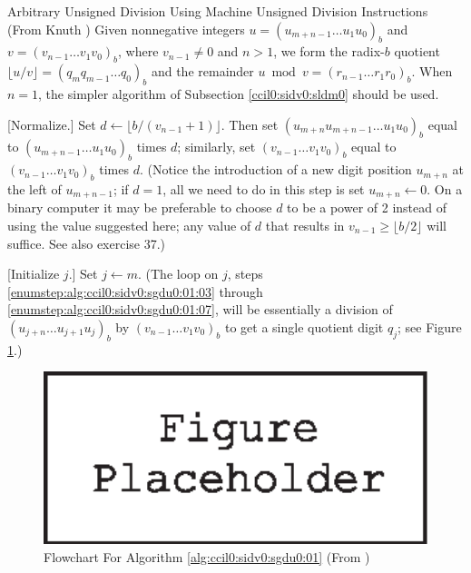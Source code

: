 \begin{vworkalgorithmstatementpar}{Arbitrary Unsigned Division Using 
Machine Unsigned Division Instructions}
\label{alg:ccil0:sidv0:sgdu0:01}
(From Knuth \cite[pp. 272-273]{bibref:b:knuthclassic2ndedvol2})
Given nonnegative integers $u=(u_{m+n-1} \ldots{} u_1 u_0)_b$
and $v=(v_{n-1} \ldots{} v_1 v_0)_b$, where
$v_{n-1} \neq 0$ and $n > 1$, we form the radix-$b$ quotient
$\lfloor{}u/v\rfloor{} = (q_m q_{m-1} \ldots{} q_0)_b$ and
the remainder $u \bmod v = (r_{n-1} \ldots{} r_1 r_0)_b$.  When
$n=1$, the simpler algorithm of 
Subsection \ref{ccil0:sidv0:sldm0}
should be used. 

\begin{algblvl0}
\item \label{enumstep:alg:ccil0:sidv0:sgdu0:01:01}
      [Normalize.] Set $d \gets \lfloor{}b/(v_{n-1} + 1)\rfloor$.
      Then set $(u_{m+n} u_{m+n-1} \ldots{} u_1 u_0)_b$ equal to 
      $(u_{m+n-1} \ldots{} u_1 u_0)_b$ times $d$; similarly,
      set $(v_{n-1} \ldots{} v_1 v_0)_b$ equal to 
      $(v_{n-1} \ldots{} v_1 v_0)_b$ times $d$.  (Notice the introduction
      of a new digit position $u_{m+n}$ at the left of
      $u_{m+n-1}$; if $d=1$, all we need to do in this step is set
      $u_{m+n} \gets 0$.  On a binary computer it may be preferable
      to choose $d$ to be a power of 2 instead of using the value
      suggested here; any value of $d$ that results in
      $v_{n-1} \geq \lfloor{}b/2\rfloor$ will suffice.  See also
      exercise 37.)
\item \label{enumstep:alg:ccil0:sidv0:sgdu0:01:02}
      [Initialize $j$.]  Set $j \gets m$.  (The loop on $j$,
      steps 
      \ref{enumstep:alg:ccil0:sidv0:sgdu0:01:03} 
      through 
      \ref{enumstep:alg:ccil0:sidv0:sgdu0:01:07}, 
      will be essentially a division of 
      $(u_{j+n} \ldots{} u_{j+1} u_j)_b$ by $(v_{n-1} \ldots{} v_1 v_0)_b$ to
      get a single quotient digit $q_j$; see Figure \ref{fig:alg:ccil0:sidv0:sgdu0:01:01}.)

\begin{figure}
\centering
\includegraphics[width=4.6in]{c_cil0/kdfc01.eps}
\caption{Flowchart For Algorithm \ref{alg:ccil0:sidv0:sgdu0:01} (From \cite[p. 273]{bibref:b:knuthclassic2ndedvol2})}
\label{fig:alg:ccil0:sidv0:sgdu0:01:01}
\end{figure}


\end{algblvl0}
\end{vworkalgorithmstatementpar}
